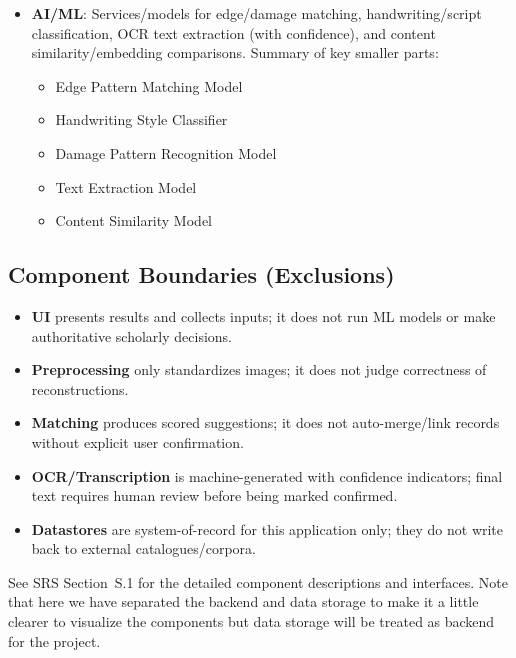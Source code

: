 \documentclass{article}
\begin{document}
\begin{itemize}
\begin{itemize}
    \item Fragment Image Database
    \item User Database
    \item Project Database
   \end{itemize}
  \item \textbf{AI/ML}: Services/models for edge/damage matching, handwriting/script classification, OCR text extraction (with confidence), and content similarity/embedding comparisons. Summary of key smaller parts:
  \begin{itemize}
    \item Edge Pattern Matching Model
    \item Handwriting Style Classifier
    \item Damage Pattern Recognition Model
    \item Text Extraction Model
    \item Content Similarity Model
   \end{itemize}
\end{itemize}

\subsection*{Component Boundaries (Exclusions)}
\begin{itemize}
  \item \textbf{UI} presents results and collects inputs; it does not run ML models or make authoritative scholarly decisions.
  \item \textbf{Preprocessing} only standardizes images; it does not judge correctness of reconstructions.
  \item \textbf{Matching} produces scored suggestions; it does not auto-merge/link records without explicit user confirmation.
  \item \textbf{OCR/Transcription} is machine-generated with confidence indicators; final text requires human review before being marked confirmed.
  \item \textbf{Datastores} are system-of-record for this application only; they do not write back to external catalogues/corpora.
\end{itemize}

See SRS Section~S.1 for the detailed component descriptions and interfaces. Note that here we have separated the backend and data storage to make it a little clearer to visualize the components but data storage will be treated as backend for the project.
\end{document}
